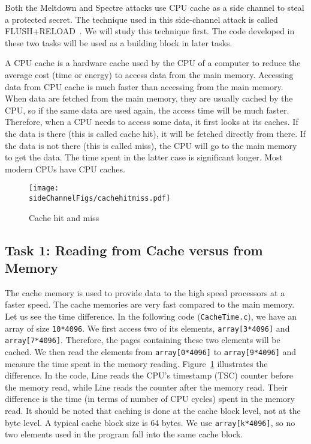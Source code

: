 Both the Meltdown and Spectre attacks use CPU cache as a side channel to steal
a protected secret. The technique used in this side-channel attack is called 
FLUSH+RELOAD~\cite{Yarom2014}. 
We will study this technique first. The code developed in these two tasks will be 
used as a building block in later tasks. 


A CPU cache is a hardware cache used by the CPU of a computer 
to reduce the average cost (time or energy) to access
data from the main memory. Accessing data from CPU cache is much faster
than accessing from the main memory. When data are fetched from the main memory, they
are usually cached by the CPU, so if the same data are used again, the access
time will be much faster. Therefore, when a CPU needs to access some data, it
first looks at its caches. If the data is there (this is called cache hit), 
it will be fetched directly from there. If the data is not there (this is
called miss), the CPU will go to the main memory to get the data. The time 
spent in the latter case is significant longer. Most modern CPUs have
CPU caches. 



\begin{figure}[htb]
\centering
\texttt{[image: \\sideChannelFigs/cachehitmiss.pdf]}
\caption{Cache hit and miss}
\label{sidechannel:fig:cachehitmiss}
\end{figure}


\subsection{Task 1: Reading from Cache versus from Memory}

The cache memory is used to provide data to the high speed processors at a faster speed. The
cache memories are very fast compared to the main memory. 
Let us see the time difference. In the following code (\texttt{CacheTime.c}), we 
have an array of size \texttt{10*4096}. We first access two of its elements,
\texttt{array[3*4096]} and \texttt{array[7*4096]}. Therefore, the pages 
containing these two elements will be cached. We then
read the elements from \texttt{array[0*4096]} to \texttt{array[9*4096]} and measure 
the time spent in the memory reading.
Figure~\ref{sidechannel:fig:cachehitmiss} illustrates the difference. 
In the code, Line  reads the CPU's
timestamp (TSC) counter before the memory read, while Line 
reads the counter after the memory read. Their difference is the time (in terms of number of
CPU cycles) spent in the memory read.  It should be noted that 
caching is done at the cache block level, not at the byte level. A typical cache block size 
is 64 bytes. We use \texttt{array[k*4096]}, so no two elements used in 
the program fall into the same cache block. 


